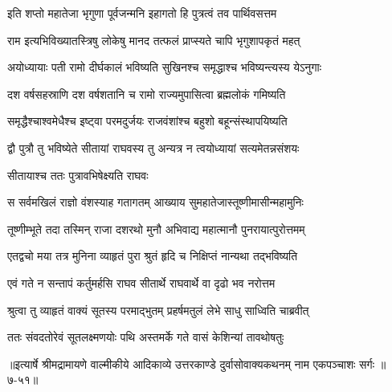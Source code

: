 \twolineshloka
{इति शप्तो महातेजा भृगुणा पूर्वजन्मनि}
{इहागतो हि पुत्रत्वं तव पार्थिवसत्तम} %

\twolineshloka
{राम इत्यभिविख्यातस्त्रिषु लोकेषु मानद}
{तत्फलं प्राप्स्यते चापि भृगुशापकृतं महत्} %

\twolineshloka
{अयोध्यायाः पती रामो दीर्घकालं भविष्यति}
{सुखिनश्च समृद्धाश्च भविष्यन्त्यस्य येऽनुगाः} %

\twolineshloka
{दश वर्षसहस्राणि दश वर्षशतानि च}
{रामो राज्यमुपासित्वा ब्रह्मलोकं गमिष्यति} %

\twolineshloka
{समृद्धैश्चाश्वमेधैश्च इष्ट्वा परमदुर्जयः}
{राजवंशांश्च बहुशो बहून्संस्थापयिष्यति} %

\twolineshloka
{द्वौ पुत्रौ तु भविष्येते सीतायां राघवस्य तु}
{अन्यत्र न त्वयोध्यायां सत्यमेतन्नसंशयः} %

\onelineshloka
{सीतायाश्च ततः पुत्रावभिषेक्ष्यति राघवः} %

\twolineshloka
{स सर्वमखिलं राज्ञो वंशस्याह गतागतम्}
{आख्याय सुमहातेजास्तूष्णीमासीन्महामुनिः} %

\twolineshloka
{तूष्णीम्भूते तदा तस्मिन् राजा दशरथो मुनौ}
{अभिवाद्य महात्मानौ पुनरायात्पुरोत्तमम्} %

\twolineshloka
{एतद्वचो मया तत्र मुनिना व्याहृतं पुरा}
{श्रुतं हृदि च निक्षिप्तं नान्यथा तद्भविष्यति} %

\twolineshloka
{एवं गते न सन्तापं कर्तुमर्हसि राघव}
{सीतार्थे राघवार्थे वा दृढो भव नरोत्तम} %

\twolineshloka
{श्रुत्वा तु व्याहृतं वाक्यं सूतस्य परमाद्भुतम्}
{प्रहर्षमतुलं लेभे साधु साध्विति चाब्रवीत्} %

\twolineshloka
{ततः संवदतोरेवं सूतलक्ष्मणयोः पथि}
{अस्तमर्के गते वासं केशिन्यां तावथोषतुः} %


॥इत्यार्षे श्रीमद्रामायणे वाल्मीकीये आदिकाव्ये उत्तरकाण्डे दुर्वासोवाक्यकथनम् नाम एकपञ्चाशः सर्गः ॥७-५१॥
